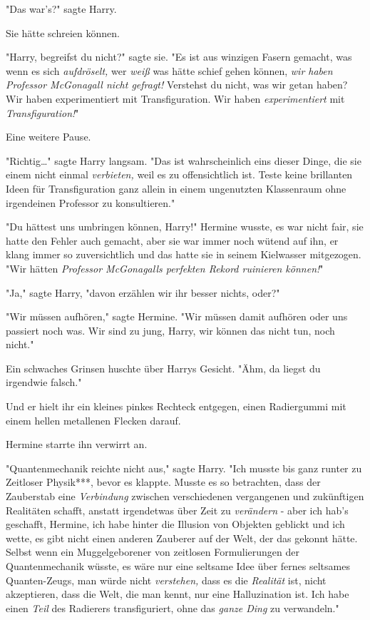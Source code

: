 {"Das war's?" sagte Harry.

Sie hätte schreien können.

"Harry, begreifst du nicht?" sagte sie. "Es ist aus winzigen Fasern gemacht, was wenn es sich \emph{aufdröselt,} wer \emph{weiß} was hätte schief gehen können, \emph{wir haben Professor McGonagall nicht gefragt!} Verstehst du nicht, was wir getan haben? Wir haben experimentiert mit Transfiguration. Wir haben \emph{experimentiert} mit \emph{Transfiguration!}"

Eine weitere Pause.

"Richtig…" sagte Harry langsam. "Das ist wahrscheinlich eins dieser Dinge, die sie einem nicht einmal \emph{verbieten,} weil es zu offensichtlich ist. Teste keine brillanten Ideen für Transfiguration ganz allein in einem ungenutzten Klassenraum ohne irgendeinen Professor zu konsultieren."

"Du hättest uns umbringen können, Harry!" Hermine wusste, es war nicht fair, sie hatte den Fehler auch gemacht, aber sie war immer noch wütend auf ihn, er klang immer so zuversichtlich und das hatte sie in seinem Kielwasser mitgezogen. "Wir hätten \emph{Professor McGonagalls perfekten Rekord ruinieren können!}"

"Ja," sagte Harry, "davon erzählen wir ihr besser nichts, oder?"

"Wir müssen aufhören," sagte Hermine. "Wir müssen damit aufhören oder uns passiert noch was. Wir sind zu jung, Harry, wir können das nicht tun, noch nicht."

Ein schwaches Grinsen huschte über Harrys Gesicht. "Ähm, da liegst du irgendwie falsch."

Und er hielt ihr ein kleines pinkes Rechteck entgegen, einen Radiergummi mit einem hellen metallenen Flecken darauf.

Hermine starrte ihn verwirrt an.

"Quantenmechanik reichte nicht aus," sagte Harry. "Ich musste bis ganz runter zu Zeitloser Physik***, bevor es klappte. Musste es so betrachten, dass der Zauberstab eine \emph{Verbindung} zwischen verschiedenen vergangenen und zukünftigen Realitäten schafft, anstatt irgendetwas über Zeit zu \emph{verändern} - aber ich hab's geschafft, Hermine, ich habe hinter die Illusion von Objekten geblickt und ich wette, es gibt nicht einen anderen Zauberer auf der Welt, der das gekonnt hätte. Selbst wenn ein Muggelgeborener von zeitlosen Formulierungen der Quantenmechanik wüsste, es wäre nur eine seltsame Idee über fernes seltsames Quanten-Zeugs, man würde nicht \emph{verstehen,} dass es die \emph{Realität} ist, nicht akzeptieren, dass die Welt, die man kennt, nur eine Halluzination ist. Ich habe einen \emph{Teil} des Radierers transfiguriert, ohne das \emph{ganze Ding} zu verwandeln."

}
